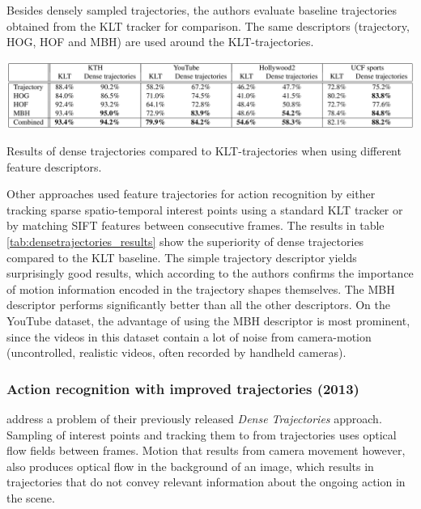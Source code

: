 Besides densely sampled trajectories, the authors evaluate baseline trajectories obtained from the KLT tracker for comparison.
The same descriptors (trajectory, HOG, HOF and MBH) are used around the KLT-trajectories.

\begin{table}[H]
    \centering
    \includegraphics[width=\textwidth]{img_conventional/densetrajectories_results}
    \caption{Results of dense trajectories compared to KLT-trajectories when using different feature descriptors. \cite{wang_action_2011}}
    \label{tab:densetrajectories_results}
\end{table}

Other approaches used feature trajectories for action recognition by either tracking sparse spatio-temporal interest points using a standard KLT tracker \cite{lucas_iterative_1981} or by matching SIFT features \cite{lowe_distinctive_2004} between consecutive frames.
The results in table \ref{tab:densetrajectories_results} show the superiority of dense trajectories compared to the KLT baseline.
The simple trajectory descriptor yields surprisingly good results, which according to the authors confirms the importance of motion information encoded in the trajectory shapes themselves.
The MBH descriptor performs significantly better than all the other descriptors.
On the YouTube dataset, the advantage of using the MBH descriptor is most prominent, since the videos in this dataset contain a lot of noise from camera-motion (uncontrolled, realistic videos, often recorded by handheld cameras).


\subsubsection{Action recognition with improved trajectories (2013)}
\textcite{wang_action_2013} address a problem of their previously released \textit{Dense Trajectories} approach.
Sampling of interest points and tracking them to from trajectories uses optical flow fields between frames.
Motion that results from camera movement however, also produces optical flow in the background of an image, which results in trajectories that do not convey relevant information about the ongoing action in the scene.

